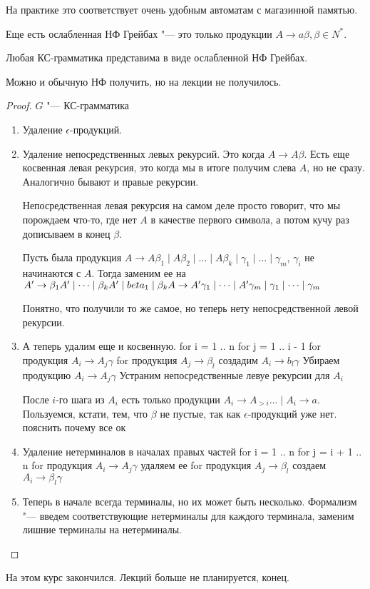 На практике это соответствует очень удобным автоматам с магазинной памятью.

Еще есть ослабленная НФ Грейбах "--- это только продукции $A \to a \beta, \beta \in N^*$.

\begin{theorem}
Любая КС-грамматика представима в виде ослабленной НФ Грейбах.
\end{theorem} 
\begin{Rem}
Можно и обычную НФ получить, но на лекции не получилось.
\end{Rem}
\begin{proof}
$G$ "--- КС-грамматика

\begin{enumerate}
\item
Удаление $\epsilon$-продукций.

\item
Удаление непосредственных левых рекурсий. Это когда $A \to A \beta$. 
Есть еще косвенная левая рекурсия, это когда мы в итоге получим слева $A$, но не сразу.
Аналогично бывают и правые рекурсии.

Непосредственная левая рекурсия на самом деле просто говорит, что мы порождаем что-то, где нет $A$ в качестве первого символа, а потом кучу раз дописываем в конец $\beta$.

Пусть была продукция $A \to A \beta_1 \mid A\beta_2 \mid \dots \mid A \beta_k \mid \gamma_1 \mid \dots \mid \gamma_m$, $\gamma_i$ не начинаются с $A$.
Тогда заменим ее на $\\
A' \to \beta_1 A' \mid \dots \mid \beta_k A' \mid beta_1 \mid \beta_k \\
A \to A' \gamma_1 \mid \dots \mid A' \gamma_m \mid \gamma_1 \mid \dots \mid \gamma_m$ 

Понятно, что получили то же самое, но теперь нету непосредственной левой рекурсии.

\item
А теперь удалим еще и косвенную.
for i = 1 .. n
    for j = 1 .. i - 1
        for продукция $A_i \to A_j \gamma$
            for продукция $A_j \to \beta_l$
                создадим $A_i \to b_l \gamma$
            Убираем продукцию $A_i \to A_j \gamma$
    Устраним непосредственные левуе рекурсии для $A_i$

После $i$-го шага из $A_i$ есть только продукции $A_i \to A_{>i} \dots \mid A_i \to a$.
Пользуемся, кстати, тем, что $\beta$ не пустые, так как $\epsilon$-продукций уже нет.
\TODO пояснить почему все ок

\item
Удаление нетерминалов в началах правых частей
for i = 1 .. n
    for j = i + 1 .. n
        for продукция $A_i \to A_j \gamma$
            удаляем ее
            for продукция $A_j \to \beta_l$
                создаем $A_i \to \beta_l \gamma$

\item
Теперь в начале всегда терминалы, но их может быть несколько.
Формализм "--- введем соответствующие нетерминалы для каждого терминала, заменим лишние терминалы на нетерминалы.     

\end{enumerate}
\end{proof}

На этом курс закончился. Лекций больше не планируется, конец.
